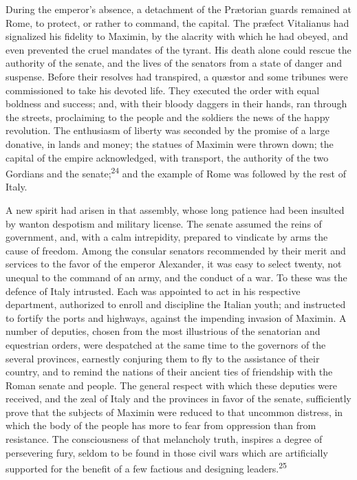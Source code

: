 

During the emperor’s absence, a detachment of the Prætorian
guards remained at Rome, to protect, or rather to command, the
capital. The præfect Vitalianus had signalized his fidelity to
Maximin, by the alacrity with which he had obeyed, and even
prevented the cruel mandates of the tyrant. His death alone could
rescue the authority of the senate, and the lives of the senators
from a state of danger and suspense. Before their resolves had
transpired, a quæstor and some tribunes were commissioned to take
his devoted life. They executed the order with equal boldness and
success; and, with their bloody daggers in their hands, ran
through the streets, proclaiming to the people and the soldiers
the news of the happy revolution. The enthusiasm of liberty was
seconded by the promise of a large donative, in lands and money;
the statues of Maximin were thrown down; the capital of the
empire acknowledged, with transport, the authority of the two
Gordians and the senate;\textsuperscript{24} and the example of Rome was followed
by the rest of Italy.


A new spirit had arisen in that assembly, whose long patience had
been insulted by wanton despotism and military license. The
senate assumed the reins of government, and, with a calm
intrepidity, prepared to vindicate by arms the cause of freedom.
Among the consular senators recommended by their merit and
services to the favor of the emperor Alexander, it was easy to
select twenty, not unequal to the command of an army, and the
conduct of a war. To these was the defence of Italy intrusted.
Each was appointed to act in his respective department,
authorized to enroll and discipline the Italian youth; and
instructed to fortify the ports and highways, against the
impending invasion of Maximin. A number of deputies, chosen from
the most illustrious of the senatorian and equestrian orders,
were despatched at the same time to the governors of the several
provinces, earnestly conjuring them to fly to the assistance of
their country, and to remind the nations of their ancient ties of
friendship with the Roman senate and people. The general respect
with which these deputies were received, and the zeal of Italy
and the provinces in favor of the senate, sufficiently prove that
the subjects of Maximin were reduced to that uncommon distress,
in which the body of the people has more to fear from oppression
than from resistance. The consciousness of that melancholy truth,
inspires a degree of persevering fury, seldom to be found in
those civil wars which are artificially supported for the benefit
of a few factious and designing leaders.\textsuperscript{25}

